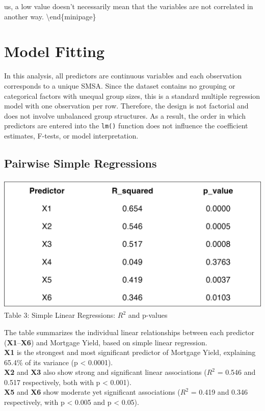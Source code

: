 \documentclass[
  11pt,
]{article}
\begin{document}
us, a low value doesn't necessarily mean that the variables are not
correlated in another way. \textbackslash end\{minipage\}

\section{Model Fitting}\label{model-fitting}

In this analysis, all predictors are continuous variables and each
observation corresponds to a unique SMSA. Since the dataset contains no
grouping or categorical factors with unequal group sizes, this is a
standard multiple regression model with one observation per row.
Therefore, the design is not factorial and does not involve unbalanced
group structures. As a result, the order in which predictors are entered
into the \texttt{lm()} function does not influence the coefficient
estimates, F-tests, or model interpretation.

\subsection{Pairwise Simple
Regressions}\label{pairwise-simple-regressions}

\begin{minipage}{0.5\textwidth}
\includegraphics[width=\linewidth]{simple_regression_table.png}\\
\small Table 3: Simple Linear Regressions: $R^2$ and p-values
\end{minipage}
\hspace{1em}
\begin{minipage}{0.52\textwidth}
\small
The table summarizes the individual linear relationships between each predictor (\textbf{X1}–\textbf{X6}) and Mortgage Yield, based on simple linear regression.\\
\textbf{X1} is the strongest and most significant predictor of Mortgage Yield, explaining 65.4\% of its variance (p < 0.0001). \\
\textbf{X2} and \textbf{X3} also show strong and significant linear associations ($R^2$ = 0.546 and 0.517 respectively, both with p < 0.001).\\
\textbf{X5} and \textbf{X6} show moderate yet significant associations ($R^2$ = 0.419 and 0.346 respectively, with p < 0.005 and p < 0.05).
\end{minipage}
\addtocounter{table}{1}
\end{document}
